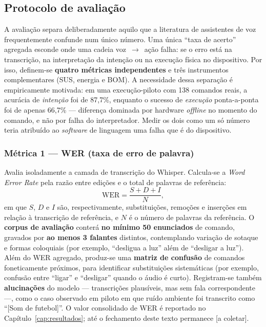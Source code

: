 
\subsection{Protocolo de avaliação}\label{sec:protocolo}

A avaliação separa deliberadamente aquilo que a literatura de assistentes de voz
frequentemente confunde num único número. Uma única ``taxa de acerto'' agregada esconde
onde uma cadeia voz~$\rightarrow$~ação falha: se o erro está na transcrição, na
interpretação da intenção ou na execução física no dispositivo. Por isso, definem-se
\textbf{quatro métricas independentes} e três instrumentos complementares (SUS, energia e
BOM). A necessidade dessa separação é empiricamente motivada: em uma execução-piloto com
138 comandos reais, a acurácia de \emph{intenção} foi de 87,7\%, enquanto o sucesso de
\emph{execução} ponta-a-ponta foi de apenas 66,7\% --- diferença dominada por hardware
\textit{offline} no momento do comando, e não por falha do interpretador. Medir os dois
como um só número teria atribuído ao \textit{software} de linguagem uma falha que é do
dispositivo.

\subsubsection{Métrica 1 --- WER (taxa de erro de palavra)}

Avalia isoladamente a camada de transcrição do Whisper. Calcula-se a
\textit{Word Error Rate} pela razão entre edições e o total de palavras de referência:
\[
\mathrm{WER} = \frac{S + D + I}{N},
\]
em que $S$, $D$ e $I$ são, respectivamente, substituições, remoções e inserções em
relação à transcrição de referência, e $N$ é o número de palavras da referência. O
\textbf{corpus de avaliação} conterá \textbf{no mínimo 50 enunciados} de comando,
gravados por \textbf{ao menos 3 falantes} distintos, contemplando variação de sotaque e
formas coloquiais (por exemplo, ``desligua a luz'' além de ``desligar a luz''). Além do
WER agregado, produz-se uma \textbf{matriz de confusão} de comandos foneticamente
próximos, para identificar substituições sistemáticas (por exemplo, confusão entre
``ligar'' e ``desligar'' quando o áudio é curto). Registram-se também \textbf{alucinações}
do modelo --- transcrições plausíveis, mas sem fala correspondente ---, como o caso
observado em piloto em que ruído ambiente foi transcrito como ``[Som de futebol]''.
O valor consolidado de WER é reportado no Capítulo~\ref{cap:resultados}; até o
fechamento deste texto permanece [a coletar].

